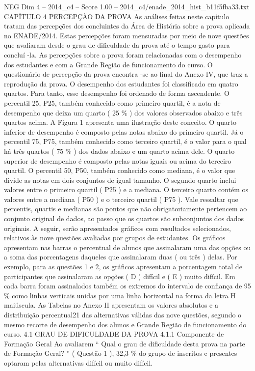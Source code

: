\begin{textsample}{NEG Dim 4 – 2014\_c4 – Score 1.00 – 2014\_c4/enade\_2014\_hist\_b11f5fba33.txt}  \label{ex:f4_neg_154}
CAPÍTULO 4 PERCEPÇÃO DA PROVA As análises feitas neste capítulo tratam das percepções dos concluintes da Área de História sobre a prova aplicada no ENADE/2014.
Estas percepções foram mensuradas por meio de nove questões que avaliaram desde o grau de dificuldade da prova até o tempo gasto para concluí -la.
As percepções sobre a prova foram relacionadas com o desempenho dos estudantes e com a Grande Região de funcionamento do curso.
O questionário de percepção da prova encontra -se ao final do Anexo IV, que traz a reprodução da prova.
O desempenho dos estudantes foi classificado em quatro quartos.
Para tanto, esse desempenho foi ordenado de forma ascendente.
O percentil 25, P25, também conhecido como primeiro quartil, é a nota de desempenho que deixa um quarto ( 25 \% ) dos valores observados abaixo e três quartos acima.
A Figura 1 apresenta uma ilustração deste conceito.
O quarto inferior de desempenho é composto pelas notas abaixo do primeiro quartil.
Já o percentil 75, P75, também conhecido como terceiro quartil, é o valor para o qual há três quartos ( 75 \% ) dos dados abaixo e um quarto acima dele.
O quarto superior de desempenho é composto pelas notas iguais ou acima do terceiro quartil.
O percentil 50, P50, também conhecido como mediana, é o valor que divide as notas em dois conjuntos de igual tamanho.
O segundo quarto inclui valores entre o primeiro quartil ( P25 ) e a mediana.
O terceiro quarto contém os valores entre a mediana ( P50 ) e o terceiro quartil ( P75 ).
Vale ressaltar que percentis, quartis e medianas são pontos que não obrigatoriamente pertencem ao conjunto original de dados, ao passo que os quartos são subconjuntos dos dados originais.
A seguir, serão apresentados gráficos com resultados selecionados, relativos às nove questões avaliadas por grupos de estudantes.
Os gráficos apresentam nas barras o percentual de alunos que assinalaram uma das opções ou a soma das porcentagens daqueles que assinalaram duas ( ou três ) delas.
Por exemplo, para as questões 1 e 2, os gráficos apresentam a porcentagem total de participantes que assinalaram as opções ( D ) difícil e ( E ) muito difícil.
Em cada barra foram assinalados também os extremos do intervalo de confiança de 95 \% como linhas verticais unidas por uma linha horizontal na forma da letra H maiúscula.
As Tabelas no Anexo II apresentam os valores absolutos e a distribuição percentual21 das alternativas válidas das nove questões, segundo o mesmo recorte de desempenho dos alunos e Grande Região de funcionamento do curso. 4.1 GRAU DE DIFICULDADE DA PROVA 4.1.1 Componente de Formação Geral Ao avaliarem “ Qual o grau de dificuldade desta prova na parte de Formação Geral? ” ( Questão 1 ), 32,3 \% do grupo de inscritos e presentes optaram pelas alternativas difícil ou muito difícil.

\end{textsample}
